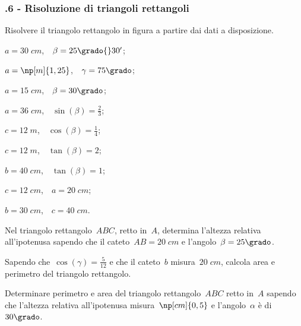 \subsubsection*{\thechapter.6 - Risoluzione di triangoli rettangoli}

\begin{esercizio}
\label{ese:G.7}%
Risolvere il triangolo rettangolo in figura a partire dai dati a disposizione.
\begin{multicols}{2}
\begin{center}
 
\end{center}
\begin{enumeratea}
 \item $a=30\;\unit{cm}$,$\quad\beta=25\grado{}30'$;
 \item $a=\np[m]{1,25}$,$\quad\gamma=75\grado$;
 \item $a=15\;\unit{cm}$,$\quad\beta=30\grado$;
 \item $a=36\;\unit{cm}$,$\quad\sin(\beta)=\frac{2}{3}$;
 \item $c=12\;\unit{m}$,$\quad\cos(\beta)=\frac{1}{4}$;
 \item $c=12\;\unit{m}$,$\quad\tan(\beta)=2$;
 \item $b=40\;\unit{cm}$,$\quad\tan(\beta)=1$;
 \item $c=12\;\unit{cm}$,$\quad a=20\;\unit{cm}$;
 \item $b=30\;\unit{cm}$,$\quad c=40\;\unit{cm}$.
\end{enumeratea}
\end{multicols}
\end{esercizio}

\begin{esercizio}
\label{ese:G.8}
Nel triangolo rettangolo~$ABC$, retto in~$A$, determina l'altezza relativa all'ipotenusa sapendo che il cateto~${AB} = 20\;\unit{cm}$
e l'angolo~$\beta=25\grado$.
\end{esercizio}

\begin{esercizio}
\label{ese:G.9}
Sapendo che~$\cos(\gamma)=\frac{5}{12}$ e che il cateto~$b$ misura~$20\;\unit{cm}$, calcola area e perimetro del triangolo rettangolo.
\end{esercizio}

\begin{esercizio}
\label{ese:G.10}
Determinare perimetro e area del triangolo rettangolo~$ABC$ retto in~$A$ sapendo che l'altezza relativa all'ipotenusa misura~$\np[cm]{0,5}$
e l'angolo~$\alpha$ è di~$30\grado$.
\end{esercizio}

